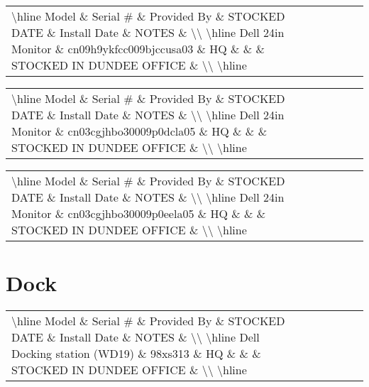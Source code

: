 \documentclass{article}%
\begin{document}
\begin{tabularx}{\textwidth}{|X|X|X|X|X|X|X|}%
\textbackslash{}hline%
Model \& Serial \# \& Provided By \& STOCKED DATE \& Install Date \& NOTES \&  \textbackslash{}\textbackslash{}%
\textbackslash{}hline%
Dell 24in Monitor \& cn09h9ykfcc009bjccusa03 \& HQ \&  \&  \& STOCKED IN DUNDEE OFFICE \&  \textbackslash{}\textbackslash{}%
\textbackslash{}hline%
\end{tabularx}%
\begin{tabularx}{\textwidth}{|X|X|X|X|X|X|X|}%
\textbackslash{}hline%
Model \& Serial \# \& Provided By \& STOCKED DATE \& Install Date \& NOTES \&  \textbackslash{}\textbackslash{}%
\textbackslash{}hline%
Dell 24in Monitor \& cn03cgjhbo30009p0dcla05 \& HQ \&  \&  \& STOCKED IN DUNDEE OFFICE \&  \textbackslash{}\textbackslash{}%
\textbackslash{}hline%
\end{tabularx}%
\begin{tabularx}{\textwidth}{|X|X|X|X|X|X|X|}%
\textbackslash{}hline%
Model \& Serial \# \& Provided By \& STOCKED DATE \& Install Date \& NOTES \&  \textbackslash{}\textbackslash{}%
\textbackslash{}hline%
Dell 24in Monitor \& cn03cgjhbo30009p0eela05 \& HQ \&  \&  \& STOCKED IN DUNDEE OFFICE \&  \textbackslash{}\textbackslash{}%
\textbackslash{}hline%
\end{tabularx}

%
\section{Dock}%
\label{sec:Dock}%
\begin{tabularx}{\textwidth}{|X|X|X|X|X|X|X|}%
\textbackslash{}hline%
Model \& Serial \# \& Provided By \& STOCKED DATE \& Install Date \& NOTES \&  \textbackslash{}\textbackslash{}%
\textbackslash{}hline%
Dell Docking station (WD19) \& 98xs313 \& HQ \&  \&  \& STOCKED IN DUNDEE OFFICE \&  \textbackslash{}\textbackslash{}%
\textbackslash{}hline%
\end{tabularx}

%
\end{document}
